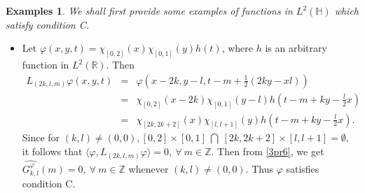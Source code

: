 \documentclass[a4paper,12pt,reqno]{amsart}
\theoremstyle{plain}
\numberwithin{equation}{section}
\newtheorem{example}{Examples}[section]
\theoremstyle{definition}
\begin{document}
\begin{example}
We shall first provide some examples of functions in $L^{2}(\mathbb{H})$ which satisfy condition C.
\end{example}
\begin{itemize}
\item [1.] Let $\varphi(x,y,t)=\chi_{[0,2]}(x)\chi_{[0,1]}(y)h(t)$, where $h$ is an arbitrary function in $L^{2}(\mathbb{R})$. Then
\begin{eqnarray*}
L_{(2k,l,m)}\varphi (x,y,t)
&=&\varphi(x-2k,y-l,t-m+\frac{1}{2}(2ky-xl))\\
&=& \chi_{[0,2]}(x-2k)\chi_{[0,1]}(y-l) h(t-m+ky-\frac{l}{2}x)\\
&=& \chi_{[2k,2k+2]}(x)\chi_{[l,l+1]}(y) h(t-m+ky-\frac{l}{2}x).
\end{eqnarray*}
Since for $(k,l)\neq (0,0), [0,2]\times [0,1]~\bigcap~ [2k,2k+2]\times [l,l+1]=\emptyset,$  it follows that $\langle \varphi, L_{(2k,l,m)}\varphi\rangle=0,~\forall~ m\in\mathbb{Z}$. Then from \eqref{3pr6}, we get $\widehat{G_{k,l}^{\varphi}}(m)=0,~\forall~ m\in\mathbb{Z}$ whenever $(k,l)\neq (0,0)$. Thus $\varphi$ satisfies condition C.


\end{itemize}
\end{document}
